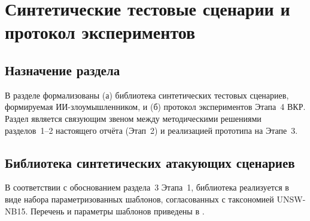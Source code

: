 
\section{Синтетические тестовые сценарии и протокол экспериментов}

\subsection{Назначение раздела}

В разделе формализованы (а) библиотека синтетических тестовых сценариев,
формируемая ИИ-злоумышленником, и (б) протокол экспериментов Этапа~4 ВКР.
Раздел является связующим звеном между методическими решениями
разделов~1--2 настоящего отчёта (Этап~2) и реализацией прототипа на
Этапе~3.

\subsection{Библиотека синтетических атакующих сценариев}

В соответствии с обоснованием раздела~3 Этапа~1, библиотека реализуется
в виде набора параметризованных шаблонов, согласованных с таксономией
UNSW-NB15. Перечень и параметры шаблонов приведены в
.

